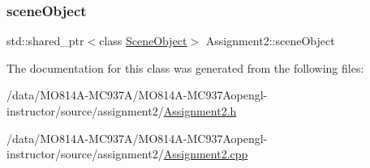 \hypertarget{class_assignment2_a3afcc7cf71f0b1eb855482057beb1146}{}\label{class_assignment2_a3afcc7cf71f0b1eb855482057beb1146}
\subsubsection{\texorpdfstring{scene\+Object}{sceneObject}}
{\footnotesize\ttfamily std\+::shared\+\_\+ptr$<$class \hyperlink{class_scene_object}{Scene\+Object}$>$ Assignment2\+::scene\+Object\hspace{0.3cm}{\ttfamily [private]}}



The documentation for this class was generated from the following files\+:\begin{DoxyCompactItemize}
\item
/data/MO814A-MC937A/MO814A-MC937Aopengl-\/instructor/source/assignment2/\hyperlink{_assignment2_8h}{Assignment2.\+h}\item
/data/MO814A-MC937A/MO814A-MC937Aopengl-\/instructor/source/assignment2/\hyperlink{_assignment2_8cpp}{Assignment2.\+cpp}\end{DoxyCompactItemize}
